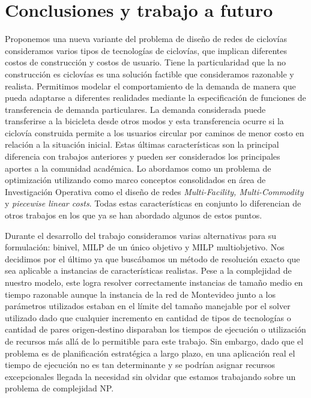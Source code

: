 \chapter{Conclusiones y trabajo a futuro}

Proponemos una nueva variante del problema de diseño de redes de ciclovías consideramos varios tipos de tecnologías de ciclovías, que implican diferentes costos de construcción y costos de usuario. Tiene la particularidad que la no construcción es ciclovías es una solución factible que consideramos razonable y realista. Permitimos modelar el comportamiento de la demanda de manera que pueda adaptarse a diferentes realidades mediante la especificación de funciones de transferencia de demanda particulares. La demanda considerada puede transferirse a la bicicleta desde otros modos y esta transferencia ocurre si la ciclovía construida permite a los usuarios circular por caminos de menor costo en relación a la situación inicial. Estas últimas características son la principal diferencia con trabajos anteriores y pueden ser considerados los principales aportes a la comunidad académica. Lo abordamos como un problema de optimización utilizando como marco conceptos consolidados en área de Investigación Operativa como el diseño de redes {\it Multi-Facility, Multi-Commodity} y {\it piecewise linear costs}. Todas estas características en conjunto lo diferencian de otros trabajos en los que ya se han abordado algunos de estos puntos.

Durante el desarrollo del trabajo consideramos varias alternativas para su formulación: binivel, MILP de un único objetivo y MILP multiobjetivo. Nos decidimos por el último ya que buscábamos un método de resolución exacto que sea aplicable a instancias de características realistas. Pese a la complejidad de nuestro modelo, este logra resolver correctamente instancias de tamaño medio en tiempo razonable aunque la instancia de la red de Montevideo junto a los parámetros utilizados estaban en el límite del tamaño manejable por el solver utilizado dado que cualquier incremento en cantidad de tipos de tecnologías o cantidad de pares origen-destino disparaban los tiempos de ejecución o utilización de recursos más allá de lo permitible para este trabajo. Sin embargo, dado que el problema es de planificación estratégica a largo plazo, en una aplicación real el tiempo de ejecución no es tan determinante y se podrían asignar recursos excepcionales llegada la necesidad sin olvidar que estamos trabajando sobre un problema de complejidad NP.

